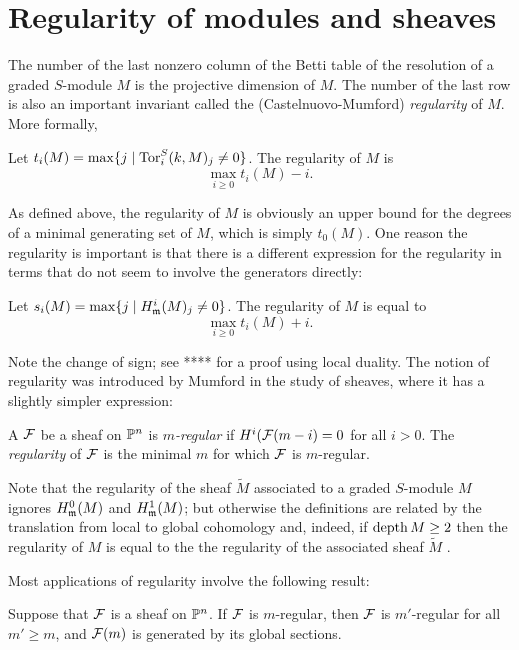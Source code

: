 \section{Regularity of modules and sheaves}
The number of the last nonzero column of the Betti table of the resolution of a graded $S$-module $M$ is the projective dimension of $M$. The number of the last row is also an important invariant called the (Castelnuovo-Mumford) \emph {regularity} of $M$. More formally,
\begin{definition}
Let $t_{i}(M) = \max \{j \mid \operatorname{Tor}^{S}_{i}(k,M)_{j} \neq 0\}$. The regularity of $M$ is
$$
\max_{i \geq 0} t_{i}(M)-i.
$$
\end{definition}

As defined above, the regularity of $M$ is obviously an upper bound for the degrees of a minimal generating
set of $M$, which is simply $t_{0}(M)$. One reason the regularity is important is that there is a different expression for the regularity in terms that do not seem to involve the generators directly:

\begin{theorem}
 Let $s_{i}(M) = \max\{j \mid H^{i}_{\mathfrak m}(M)_{j} \neq 0\}$. The regularity of $M$ is equal to
 $$
\max_{i \geq 0} t_{i}(M)+i.
$$
\end{theorem}

Note the change of sign; see **** for a proof using local duality. The notion of regularity was introduced by Mumford in the study of sheaves, where it has a slightly simpler expression:

\begin{definition}
A ${\mathcal F}$ be a sheaf on ${\mathbb P}^{n}$ is \emph{$m$-regular} if $H^{i}({\mathcal F}(m-i) = 0$ for all $i>0$. The \emph{regularity} of ${\mathcal F}$ is the minimal $m$ for which ${\mathcal F}$ is $m$-regular.
\end{definition}

 Note that the regularity
of the sheaf $\tilde M$ associated to a graded $S$-module $M$ ignores $H^{0}_{\mathfrak m}(M)$ and 
$H^{1}_{\mathfrak m}(M)$; but otherwise the definitions are related by the translation from local to global
cohomology and, indeed, if $\operatorname{depth} M \geq 2$ then the regularity of
$M$ is equal to the the regularity of the associated sheaf $\tilde M$ . 

Most applications of
regularity involve the following result\cite{Mumford****}:
\begin{theorem}

Suppose that ${\mathcal F}$ is a sheaf on ${\mathbb P}^{n}$. If ${\mathcal F}$ is $m$-regular, then ${\mathcal F}$ is $m'$-regular for all $m'\geq m$, and ${\mathcal F}(m)$ is generated by its global sections.
\end{theorem}

